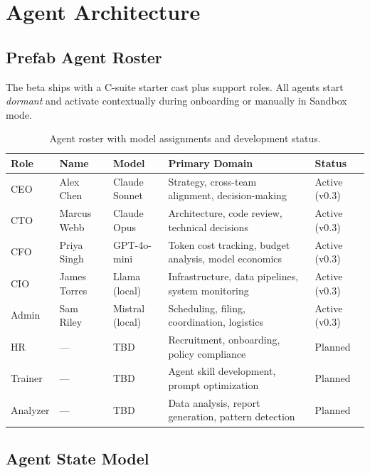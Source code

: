 \documentclass[11pt,letterpaper]{article}
\begin{document}
\section{Agent Architecture}

\subsection{Prefab Agent Roster}

The beta ships with a C-suite starter cast plus support roles. All agents start \emph{dormant} and activate contextually during onboarding or manually in Sandbox mode.

\begin{table}[H]
\centering
\small
\begin{tabularx}{\textwidth}{lllXl}
\toprule
\textbf{Role} & \textbf{Name} & \textbf{Model} & \textbf{Primary Domain} & \textbf{Status} \\
\midrule
CEO   & Alex Chen    & Claude Sonnet & Strategy, cross-team alignment, decision-making      & Active (v0.3) \\
CTO   & Marcus Webb  & Claude Opus   & Architecture, code review, technical decisions         & Active (v0.3) \\
CFO   & Priya Singh  & GPT-4o-mini   & Token cost tracking, budget analysis, model economics  & Active (v0.3) \\
CIO   & James Torres & Llama (local) & Infrastructure, data pipelines, system monitoring      & Active (v0.3) \\
Admin & Sam Riley    & Mistral (local) & Scheduling, filing, coordination, logistics           & Active (v0.3) \\
\midrule
HR       & ---      & TBD & Recruitment, onboarding, policy compliance        & Planned \\
Trainer  & ---      & TBD & Agent skill development, prompt optimization      & Planned \\
Analyzer & ---      & TBD & Data analysis, report generation, pattern detection & Planned \\
\bottomrule
\end{tabularx}
\caption{Agent roster with model assignments and development status.}
\end{table}

\subsection{Agent State Model}
\end{document}
